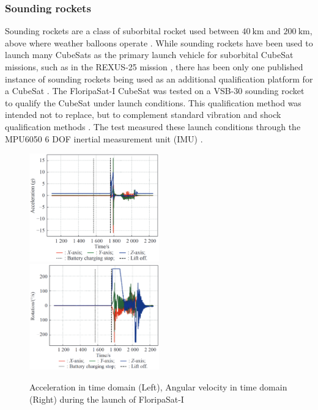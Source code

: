 \documentclass[a4paper,11pt]{article}
\begin{document}
\subsubsection{Sounding rockets}
Sounding rockets are a class of suborbital rocket used between $\SI{40}{\kilo\meter}$ and $\SI{200}{\kilo\meter}$, above where weather balloons operate \cite{seibert2006history}. While sounding rockets have been used to launch many CubeSats as the primary launch vehicle for suborbital CubeSat missions, such as in the REXUS-25 mission \cite{pont2019rexus}, there has been only one published instance of sounding rockets being used as an additional qualification platform for a CubeSat \cite{slongo2019pre}. The FloripaSat-I CubeSat was tested on a VSB-30 sounding rocket \cite{slongo2019pre} to qualify the CubeSat under launch conditions. This qualification method was intended not to replace, but to complement standard vibration and shock qualification methods \cite{slongo2019pre}. The test measured these launch conditions through the MPU6050 6 DOF inertial measurement unit (IMU) \cite{slongo2019pre}.

\begin{figure}[H]
  \includegraphics[width=0.5\textwidth]{images/floripa-accel.png}
  \includegraphics[width=0.5\textwidth]{images/floripa-rot.png}
  \caption{Acceleration in time domain (Left), Angular velocity in time domain (Right) during the launch of FloripaSat-I \cite{9316404}}
  \label{fig:accel-rot}
\end{figure}
\end{document}
